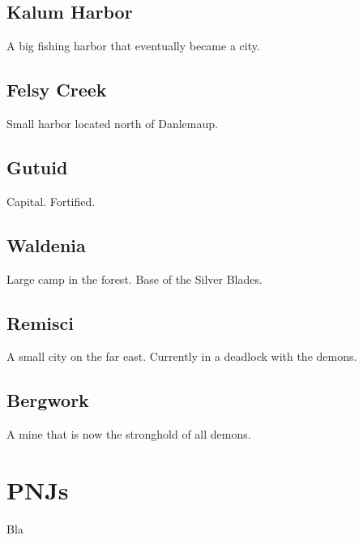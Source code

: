 \documentclass[a4paper,12pt]{book}
\begin{document}
\subsection{Kalum Harbor}
A big fishing harbor that eventually became a city.
\subsection{Felsy Creek}
Small harbor located north of Danlemaup.
\subsection{Gutuid}
Capital. Fortified.
\subsection{Waldenia}
Large camp in the forest. Base of the Silver Blades.
\subsection{Remisci}
A small city on the far east. Currently in a deadlock with the demons.
\subsection{Bergwork}
A mine that is now the stronghold of all demons.
\section{PNJs}
Bla
\end{document}
